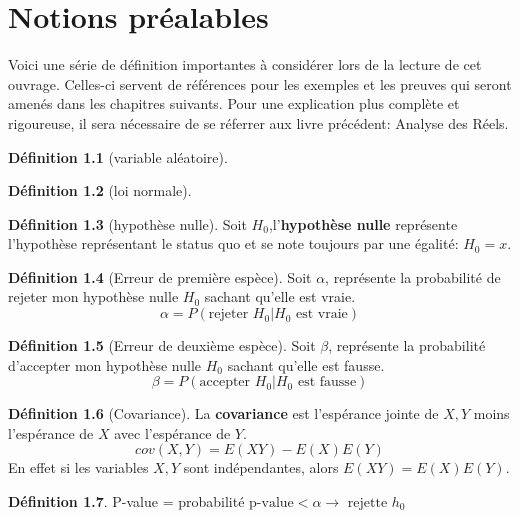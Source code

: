 \documentclass[12pt]{book}
\newcommand\todo[1]{\phantom{#1}}
\theoremstyle{definition}
\newtheorem{definition}{Définition}[section]
\begin{document}
\chapter{Notions préalables}
Voici une série de définition importantes à considérer lors de la lecture de cet ouvrage. Celles-ci servent
de références pour les exemples et les preuves qui seront amenés dans les chapitres suivants. Pour une explication
plus complète et rigoureuse, il sera nécessaire de se réferrer aux livre précédent: Analyse des Réels.
\begin{definition}[variable aléatoire]
    \label{def:variable_aleatoire}
\end{definition}

\begin{definition}[loi normale]
    \label{def:loi_normale}
    
\end{definition}

\begin{definition}[hypothèse nulle]
    \label{def:hypothese_nulle}
    Soit $H_0$,l'\textbf{hypothèse nulle} représente l'hypothèse représentant le status quo et 
    se note toujours par une égalité: $H_0 = x$.
\end{definition}

\begin{definition}[Erreur de première espèce]
    \label{def:erreur_alpha}
    Soit $\alpha$, représente la probabilité de rejeter mon hypothèse nulle $H_0$ \todo{Add link} sachant
    qu'elle est vraie.
    $$\alpha = P(\text{rejeter }H_0 | H_0\text{ est vraie})$$
\end{definition}

\begin{definition}[Erreur de deuxième espèce]
    \label{def:erreur_beta}
    Soit $\beta$, représente la probabilité d'accepter mon hypothèse nulle $H_0$ \todo{Add link} sachant
    qu'elle est fausse.
    $$\beta = P(\text{accepter }H_0 | H_0\text{ est fausse})$$
\end{definition}

\begin{definition}[Covariance]
    La \textbf{covariance} est l'espérance jointe de $X,Y$ moins l'espérance de $X$ avec l'espérance de $Y$.
    $$ cov(X, Y) = E(XY) - E(X)E(Y) $$
    En effet si les variables $X,Y$ sont indépendantes, alors $E(XY) = E(X)E(Y)$.
\end{definition}

\begin{definition}
    P-value =  probabilité
    $\text{p-value} < \alpha \to \text{ rejette } h_0$
\end{definition}
\end{document}

